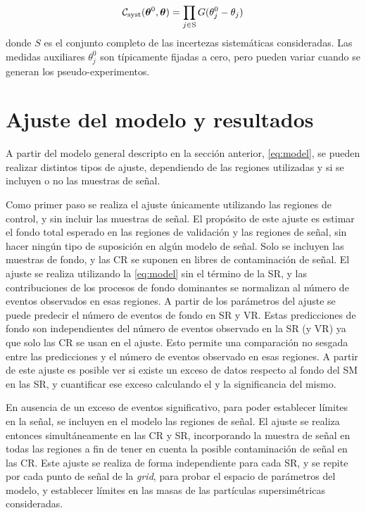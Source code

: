 \begin{equation}
  \mathcal{C}_\text{syst} (\bm{\theta}^0, \bm{\theta}) = \prod_{j \in \text{S}} G(\theta_j^0 -
  \theta_j)
\end{equation}
%
donde $S$ es el conjunto completo de las incertezas sistemáticas consideradas. Las
medidas auxiliares $\theta^0_j$ son típicamente fijadas a cero, pero pueden
variar cuando se generan los pseudo-experimentos.


\section{Ajuste del modelo y resultados}

A partir del modelo general descripto en la sección anterior, \cref{eq:model},
se pueden realizar distintos tipos de ajuste, dependiendo de las regiones utilizadas
y si se incluyen o no las muestras de señal.

Como primer paso se realiza el ajuste únicamente utilizando las regiones de
control, y sin incluir las muestras de señal. El propósito de este ajuste es
estimar el fondo total esperado en las regiones de validación y las regiones de
señal, sin hacer ningún tipo de suposición en algún modelo de señal. Solo se
incluyen las muestras de fondo, y las CR se suponen en libres de contaminación
de señal. El ajuste se realiza utilizando la \cref{eq:model} sin el término de
la SR, y las contribuciones de los procesos de fondo dominantes se normalizan al
número de eventos observados en esas regiones. A partir de los parámetros del
ajuste se puede predecir el número de eventos de fondo en SR y VR. Estas
predicciones de fondo son independientes del número de eventos observado en la
SR (y VR) ya que solo las CR se usan en el ajuste. Esto permite una comparación
no sesgada entre las predicciones y el número de eventos observado en esas
regiones.
A partir de este ajuste es posible ver si existe un exceso de datos respecto al
fondo del SM en las SR, y cuantificar ese exceso calculando el {\pvalue} y la significancia
del mismo.

En ausencia de un exceso de eventos significativo, para poder establecer límites
en la señal, se incluyen en el modelo las regiones de señal. El ajuste se realiza
entonces simultáneamente en las CR y SR, incorporando la muestra de señal
en todas las regiones a fin de tener en cuenta la posible contaminación de
señal en las CR. Este ajuste se realiza de forma independiente para cada SR, y
se repite por cada punto de señal de la \emph{grid}, para probar el espacio de
parámetros del modelo, y establecer límites en las masas de las partículas
supersimétricas consideradas.
